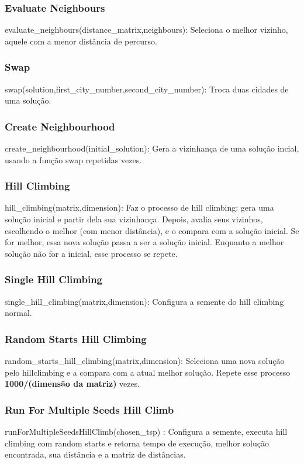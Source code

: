 \documentclass[a4paper,12 pts]{article}
\begin{document}
		\subsubsection{Evaluate Neighbours}
			evaluate\_neighbours(distance\_matrix,neighbours): Seleciona o melhor vizinho, aquele com a menor distância de percurso.
		\subsubsection{Swap}
			swap(solution,first\_city\_number,second\_city\_number): Troca duas cidades de uma solução.
		\subsubsection{Create Neighbourhood}
			create\_neighbourhood(initial\_solution): Gera a vizinhança de uma solução incial, usando a função swap repetidas vezes.
		\subsubsection{Hill Climbing}
			hill\_climbing(matrix,dimension): Faz o processo de hill climbing: gera uma solução inicial e partir dela sua vizinhança. Depois, avalia seus vizinhos, escolhendo o melhor (com menor distância), e o compara com a solução inicial. Se for melhor, essa nova solução passa a ser a solução inicial. Enquanto a melhor solução não for a inicial, esse processo se repete.
		\subsubsection{Single Hill Climbing}
			single\_hill\_climbing(matrix,dimension): Configura a semente do hill climbing normal.
		\subsubsection{Random Starts Hill Climbing}
			random\_starts\_hill\_climbing(matrix,dimension): Seleciona uma nova solução pelo hillclimbing e a compara com a atual melhor solução. Repete esse processo \textbf{1000/(dimensão da matriz)} vezes.
		\subsubsection{Run For Multiple Seeds Hill Climb}
			runForMultipleSeedsHillClimb(chosen\_tsp) : Configura a semente, executa hill climbing com random starts e retorna tempo de execução, melhor solução encontrada, sua distância e a matriz de distâncias.
	
\end{document}
